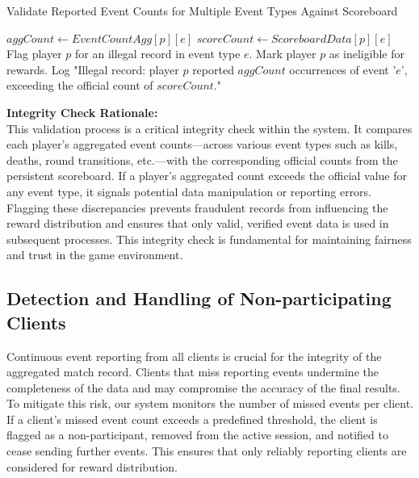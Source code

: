 \documentclass[11pt]{article}
\begin{document}
\begin{algorithm}[H]
\scriptsize
\caption{Validate Reported Event Counts for Multiple Event Types Against Scoreboard}
\label{algo:validateMultiEventCounts}
\begin{algorithmic}[1]
            \State $aggCount \gets EventCountAgg[p][e]$
            \State $scoreCount \gets ScoreboardData[p][e]$
                \State Flag player $p$ for an illegal record in event type $e$.
                \State Mark player $p$ as ineligible for rewards.
                \State Log "Illegal record: player $p$ reported $aggCount$ occurrences of event '$e$', exceeding the official count of $scoreCount$."
            \EndIf
        \EndFor
    \EndFor
\EndProcedure
\end{algorithmic}
\end{algorithm}

\noindent\textbf{Integrity Check Rationale:} \\
This validation process is a critical integrity check within the system. It compares each player's aggregated event counts—across various event types such as kills, deaths, round transitions, etc.—with the corresponding official counts from the persistent scoreboard. If a player's aggregated count exceeds the official value for any event type, it signals potential data manipulation or reporting errors. Flagging these discrepancies prevents fraudulent records from influencing the reward distribution and ensures that only valid, verified event data is used in subsequent processes. This integrity check is fundamental for maintaining fairness and trust in the game environment.

\subsection{Detection and Handling of Non-participating Clients}

Continuous event reporting from all clients is crucial for the integrity of the aggregated match record. Clients that miss reporting events undermine the completeness of the data and may compromise the accuracy of the final results. To mitigate this risk, our system monitors the number of missed events per client. If a client’s missed event count exceeds a predefined threshold, the client is flagged as a non-participant, removed from the active session, and notified to cease sending further events. This ensures that only reliably reporting clients are considered for reward distribution.
\end{document}
